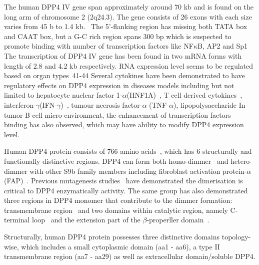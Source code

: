 The human DPP4 IV gene span approximately around 70 kb and is found on the long arm of chromosome 2 (2q24.3). The gene consists of 26 exons with each size varies from 45 b to 1.4 kb.~\cite{Abbott1994} The 5'-flanking region has missing both TATA box and CAAT box, but a G-C rich region spans 300 bp which is suspected to promote binding with number of transcription factors like NF$\kappa$B, AP2 and Sp1~\cite{Abbott1994,Böhm1995} The transcription of DPP4 IV gene has been found in two mRNA forms with length of 2.8 and 4.2 kb respectively. RNA expression level seems to be regulated based on organ types~41-44
Several cytokines have been demonstrated to have regulatory effects on DPP4 expression in diseases models including but not limited to hepatocyte nuclear factor 1-$\alpha$(HNF1A)~\cite{Erickson1999}, T cell derived cytokines~\cite{Riemann1995}, interferon-$\gamma$(IFN-$\gamma$)~\cite{Fujiwara1994}, tumour necrosis factor-$\alpha$ (TNF-$\alpha$), lipopolysaccharide 
In tumor B cell micro-environment, the enhancement of transcription factors binding has also observed, which may have ability to modify DPP4 expression level.~\cite{Bauvois2000}
\par
Human DPP4 protein consists of 766 amino acids~\cite{Bär2003,Misumi1992}, which has 6 structurally and functionally distinctive regions. DPP4 can form both homo-dimmer~\cite{Rasmussen2003,Oefner2003,Thoma2003} and hetero-dimmer with other S9b family members including fibroblast activation protein-$\alpha$ (FAP)~\cite{Ghersi2006}. Previous mutagenesis studies~\cite{Chien_2004,Chien_2006} have demonstrated the dimerisation is critical to DPP4 enzymatically activity. The same group has also demonstrated three regions in DPP4 monomer that contribute to the dimmer formation: transmembrane region~\cite{Chung_2010} and two domains within catalytic region, namely C-terminal loop~\cite{Chien_2004} and the extension part of the $\beta$-properller domain~\cite{Chien_2006}.  
\par 
Structurally, human DPP4 protein possesses three distinctive domains topology-wise, which includes a small cytoplasmic domain (aa1 - aa6), a type II transmembrane region (aa7 - aa29) as well as extracellular domain/soluble DPP4. 
\par